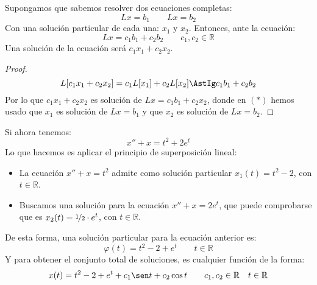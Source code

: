 \begin{prop}
Supongamos que sabemos resolver dos ecuaciones completas:
\begin{equation*}
    Lx = b_1 \qquad Lx = b_2
\end{equation*}
Con una solución particular de cada una: $x_1$ y $x_2$. Entonces, ante la ecuación:
\begin{equation*}
    Lx = c_1 b_1 + c_2 b_2 \qquad c_1,c_2\in \mathbb{R}
\end{equation*}
Una solución de la ecuación será $c_1x_1 + c_2x_2$.
    \begin{proof}
        \begin{equation*}
            L[c_1x_1 + c_2x_2] = c_1L[x_1] + c_2L[x_2] \AstIg c_1b_1 + c_2b_2
        \end{equation*}
        Por lo que $c_1x_1+c_2x_2$ es solución de $Lx = c_1b_1 + c_2x_2$, donde en $(\ast)$ hemos usado que $x_1$ es solución de $Lx=b_1$ y que $x_2$ es solución de $Lx = b_2$.
    \end{proof}
\end{prop}

\begin{ejemplo}
    Si ahora tenemos:
    \begin{equation*}
        x'' + x = t^2 + 2e^t
    \end{equation*}
    Lo que hacemos es aplicar el principio de superposición lineal:
    \begin{itemize}
        \item La ecuación $x'' + x = t^2$ admite como solución particular $x_1(t) = t^2 - 2$, con $t\in \mathbb{R}$.
        \item Buscamos una solución para la ecuación $x'' + x = 2e^t$, que puede comprobarse que es $x_2(t) = \nicefrac{1}{2}\cdot e^t$, con $t\in \mathbb{R}$.
    \end{itemize}
    De esta forma, una solución particular para la ecuación anterior es:
    \begin{equation*}
        \varphi(t) = t^2 - 2 + e^t \qquad t\in \mathbb{R}
    \end{equation*}
    Y para obtener el conjunto total de soluciones, es cualquier función de la forma:
    \begin{equation*}
        x(t) = t^2 - 2 + e^t + c_1 \sen t + c_2 \cos t \qquad c_1,c_2 \in \mathbb{R} \quad t\in \mathbb{R}
    \end{equation*}
\end{ejemplo}

